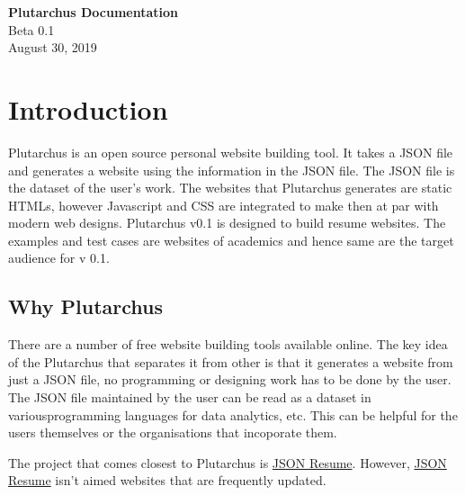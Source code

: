 \documentclass[12pt]{article}
\newcommand{\blank}[1]{\hspace*{#1}\linebreak[0]}
\begin{document}
\begin{titlepage}
    \begin{center}
        \vspace*{1cm}
        \Huge
        \textbf{Plutarchus Documentation}
        \\
        \LARGE
        \vspace{0.5cm}
         Beta 0.1
         \\
        \vspace{1.5cm}
        \vspace{8.5cm}
        \vspace{1cm}
        \hspace{2cm}
        \blank{6cm} August 30, 2019
    \end{center}
 \end{titlepage}
 
    \tableofcontents
    \newpage
    \section{Introduction}

    Plutarchus is an open source personal website building tool. It takes a JSON file and generates a website using the information in the JSON file. The JSON file is the dataset of the user's work. The websites that Plutarchus generates are static HTMLs, however Javascript and CSS are integrated to make then at par with modern web designs. Plutarchus v0.1 is designed to build resume websites. The examples and test cases are websites of academics and hence same are the target audience for v 0.1.

 
    \subsection{Why Plutarchus}

    There are a number of free website building tools available online. The key idea of the Plutarchus that separates it from other is that it generates a website from just a JSON file, no programming or designing work has to be done by the user.
    The JSON file maintained by the user can be read as a dataset in variousprogramming languages for data analytics, etc. This can be helpful for the users themselves or the organisations that incoporate them. 

    The project that comes closest to Plutarchus is \href{http://jsonresume.org/}{JSON Resume}.
    However, \href{http://jsonresume.org/}{JSON Resume} isn't aimed websites that are frequently updated.   
\end{document}
